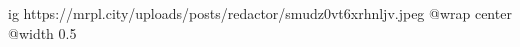  
 
 
 
 

\ifcmt
  ig https://mrpl.city/uploads/posts/redactor/smudz0vt6xrhnljv.jpeg
  @wrap center
  @width 0.5
\fi

